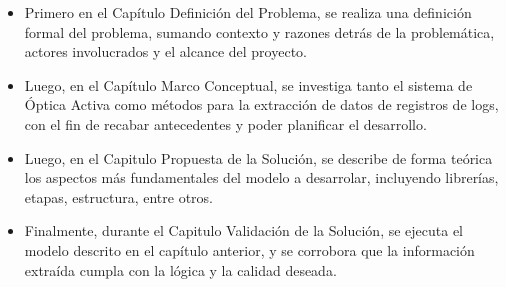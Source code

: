 \begin{itemize}
    \item Primero en el Capítulo Definición del Problema, se realiza una definición formal del problema, sumando contexto y razones detrás de la problemática, actores involucrados y el alcance del proyecto.

    \item Luego, en el Capítulo Marco Conceptual, se investiga tanto el sistema de Óptica Activa como métodos para la extracción de datos de registros de logs, con el fin de recabar antecedentes y poder planificar el desarrollo.

    \item Luego, en el Capitulo Propuesta de la Solución, se describe de forma teórica los aspectos más fundamentales del modelo a desarrolar, incluyendo librerías, etapas, estructura, entre otros.

    \item Finalmente, durante el Capitulo Validación de la Solución, se ejecuta el modelo descrito en el capítulo anterior, y se corrobora que la información extraída cumpla con la lógica y la calidad deseada.
\end{itemize}